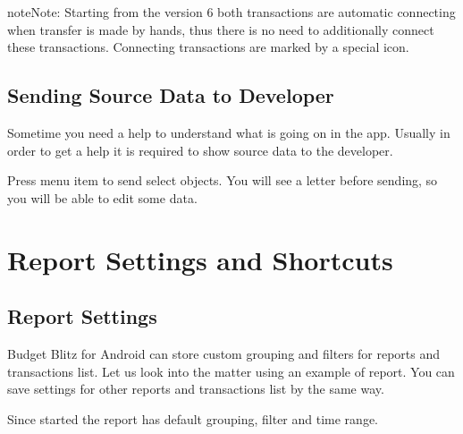 \documentclass[a4paper,10pt,english]{sphinxmanual}
\begin{document}
\noindent{}

\begin{sphinxadmonition}{note}{Note:}
\sphinxAtStartPar
Starting from the version 6 both transactions are automatic connecting when transfer is
made by hands, thus there is no need to additionally connect these transactions. Connecting
transactions are marked by a special icon.
\end{sphinxadmonition}


\section{Sending Source Data to Developer}
\label{\detokenize{bulk-actions:sending-source-data-to-developer}}
\sphinxAtStartPar
Sometime you need a help to understand what is going on in the app. Usually in
order to get a help it is required to show source data to the developer.

\sphinxAtStartPar
Press  menu item to send select objects. You will
see a letter before sending, so you will be able to edit some data.

\noindent{}

\noindent{}

\sphinxstepscope


\chapter{Report Settings and Shortcuts}
\label{\detokenize{shortcuts:report-settings-and-shortcuts}}\label{\detokenize{shortcuts:chapter-shortcuts}}\label{\detokenize{shortcuts::doc}}

\section{Report Settings}
\label{\detokenize{shortcuts:report-settings}}
\sphinxAtStartPar
Budget Blitz for Android can store custom grouping and filters for reports and transactions list. Let us
look into the matter using an example of  report. You can save
settings for other reports and transactions list by the same way.

\sphinxAtStartPar
Since started the report has default grouping, filter and time range.
\end{document}
